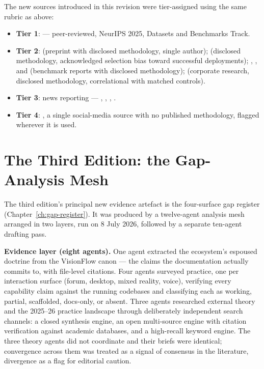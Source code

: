 The new sources introduced in this revision were tier-assigned using the same rubric as above:

\begin{itemize}
  \item \textbf{Tier 1}: \parencite{Cemri2025} --- peer-reviewed, NeurIPS 2025, Datasets and Benchmarks Track.
  \item \textbf{Tier 2}: \parencite{Liu2026} (preprint with disclosed methodology, single author); \parencite{Pereira2026Playbook} (disclosed methodology, acknowledged selection bias toward successful deployments); \parencite{RLI2025}, \parencite{CAIS2026RLI}, and \parencite{METR2026} (benchmark reports with disclosed methodology); \parencite{RampRevelio2026} (corporate research, disclosed methodology, correlational with matched controls).
  \item \textbf{Tier 3}: news reporting --- \parencite{Challenger2026}, \parencite{NYTChina2026}, \parencite{Bloomberg2026Ford}, \parencite{Chatterji2026}.
  \item \textbf{Tier 4}: \parencite{Levie2026}, a single social-media source with no published methodology, flagged wherever it is used.
\end{itemize}

\section{The Third Edition: the Gap-Analysis Mesh}

The third edition's principal new evidence artefact is the four-surface gap register (Chapter~\ref{ch:gap-register}). It was produced by a twelve-agent analysis mesh arranged in two layers, run on 8 July 2026, followed by a separate ten-agent drafting pass.

\textbf{Evidence layer (eight agents).} One agent extracted the ecosystem's espoused doctrine from the VisionFlow canon --- the claims the documentation actually commits to, with file-level citations. Four agents surveyed practice, one per interaction surface (forum, desktop, mixed reality, voice), verifying every capability claim against the running codebases and classifying each as working, partial, scaffolded, docs-only, or absent. Three agents researched external theory and the 2025--26 practice landscape through deliberately independent search channels: a closed synthesis engine, an open multi-source engine with citation verification against academic databases, and a high-recall keyword engine. The three theory agents did not coordinate and their briefs were identical; convergence across them was treated as a signal of consensus in the literature, divergence as a flag for editorial caution.

